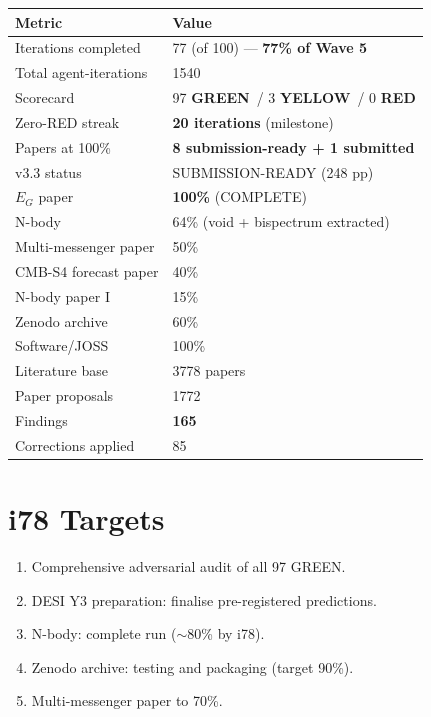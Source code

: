 \documentclass[11pt,a4paper]{article}
\newcommand{\GREEN}{\textcolor{dfdgreen}{\textbf{GREEN}}}
\newcommand{\YELLOW}{\textcolor{dfdyellow}{\textbf{YELLOW}}}
\newcommand{\RED}{\textcolor{dfdred}{\textbf{RED}}}
\begin{document}
\begin{center}
\begin{tabular}{ll}
\toprule
\textbf{Metric} & \textbf{Value} \\
\midrule
Iterations completed & 77 (of 100) --- \textbf{77\% of Wave 5} \\
Total agent-iterations & 1540 \\
Scorecard & 97 \GREEN\ / 3 \YELLOW\ / 0 \RED \\
Zero-RED streak & \textbf{20 iterations} (milestone) \\
Papers at 100\% & \textbf{8 submission-ready + 1 submitted} \\
v3.3 status & SUBMISSION-READY (248 pp) \\
$E_G$ paper & \textbf{100\%} (COMPLETE) \\
N-body & 64\% (void + bispectrum extracted) \\
Multi-messenger paper & 50\% \\
CMB-S4 forecast paper & 40\% \\
N-body paper I & 15\% \\
Zenodo archive & 60\% \\
Software/JOSS & 100\% \\
Literature base & 3778 papers \\
Paper proposals & 1772 \\
Findings & \textbf{165} \\
Corrections applied & 85 \\
\bottomrule
\end{tabular}
\end{center}

\section{i78 Targets}

\begin{enumerate}[nosep]
\item Comprehensive adversarial audit of all 97 GREEN.
\item DESI Y3 preparation: finalise pre-registered predictions.
\item N-body: complete run ($\sim$80\% by i78).
\item Zenodo archive: testing and packaging (target 90\%).
\item Multi-messenger paper to 70\%.
\end{enumerate}
\end{document}
